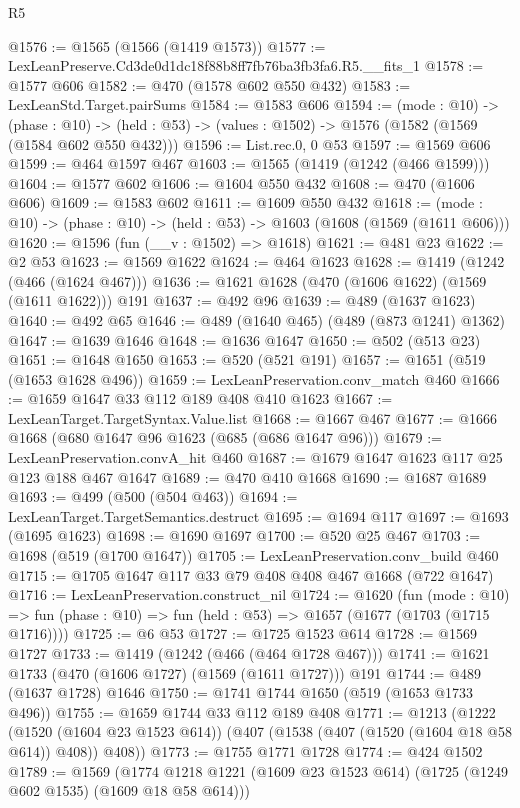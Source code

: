 \begin{lexlean}{R5}
\begin{coremodule}
@1576 := @1565 (@1566 (@1419 @1573))
@1577 := LexLeanPreserve.Cd3de0d1dc18f88b8ff7fb76ba3fb3fa6.R5.__fits_1
@1578 := @1577 @606
@1582 := @470 (@1578 @602 @550 @432)
@1583 := LexLeanStd.Target.pairSums
@1584 := @1583 @606
@1594 := (mode : @10) ->
  (phase : @10) -> (held : @53) -> (values : @1502) -> @1576 (@1582 (@1569 (@1584 @602 @550 @432)))
@1596 := List.rec.{0, 0} @53
@1597 := @1569 @606
@1599 := @464 @1597 @467
@1603 := @1565 (@1419 (@1242 (@466 @1599)))
@1604 := @1577 @602
@1606 := @1604 @550 @432
@1608 := @470 (@1606 @606)
@1609 := @1583 @602
@1611 := @1609 @550 @432
@1618 := (mode : @10) -> (phase : @10) -> (held : @53) -> @1603 (@1608 (@1569 (@1611 @606)))
@1620 := @1596 (fun (__v : @1502) => @1618)
@1621 := @481 @23
@1622 := @2 @53
@1623 := @1569 @1622
@1624 := @464 @1623
@1628 := @1419 (@1242 (@466 (@1624 @467)))
@1636 := @1621 @1628 (@470 (@1606 @1622) (@1569 (@1611 @1622))) @191
@1637 := @492 @96
@1639 := @489 (@1637 @1623)
@1640 := @492 @65
@1646 := @489 (@1640 @465) (@489 (@873 @1241) @1362)
@1647 := @1639 @1646
@1648 := @1636 @1647
@1650 := @502 (@513 @23)
@1651 := @1648 @1650
@1653 := @520 (@521 @191)
@1657 := @1651 (@519 (@1653 @1628 @496))
@1659 := LexLeanPreservation.conv_match @460
@1666 := @1659 @1647 @33 @112 @189 @408 @410 @1623
@1667 := LexLeanTarget.TargetSyntax.Value.list
@1668 := @1667 @467
@1677 := @1666 @1668 (@680 @1647 @96 @1623 (@685 (@686 @1647 @96)))
@1679 := LexLeanPreservation.convA_hit @460
@1687 := @1679 @1647 @1623 @117 @25 @123 @188 @467 @1647
@1689 := @470 @410 @1668
@1690 := @1687 @1689
@1693 := @499 (@500 (@504 @463))
@1694 := LexLeanTarget.TargetSemantics.destruct
@1695 := @1694 @117
@1697 := @1693 (@1695 @1623)
@1698 := @1690 @1697
@1700 := @520 @25 @467
@1703 := @1698 (@519 (@1700 @1647))
@1705 := LexLeanPreservation.conv_build @460
@1715 := @1705 @1647 @117 @33 @79 @408 @408 @467 @1668 (@722 @1647)
@1716 := LexLeanPreservation.construct_nil
@1724 := @1620
    (fun (mode : @10) =>
    fun (phase : @10) => fun (held : @53) => @1657 (@1677 (@1703 (@1715 @1716))))
@1725 := @6 @53
@1727 := @1725 @1523 @614
@1728 := @1569 @1727
@1733 := @1419 (@1242 (@466 (@464 @1728 @467)))
@1741 := @1621 @1733 (@470 (@1606 @1727) (@1569 (@1611 @1727))) @191
@1744 := @489 (@1637 @1728) @1646
@1750 := @1741 @1744 @1650 (@519 (@1653 @1733 @496))
@1755 := @1659 @1744 @33 @112 @189 @408
@1771 := @1213
    (@1222
      (@1520 (@1604 @23 @1523 @614))
      (@407 (@1538 (@407 (@1520 (@1604 @18 @58 @614)) @408)) @408))
@1773 := @1755 @1771 @1728
@1774 := @424 @1502
@1789 := @1569
    (@1774 @1218 @1221 (@1609 @23 @1523 @614) (@1725 (@1249 @602 @1535) (@1609 @18 @58 @614)))

\end{coremodule}
\end{lexlean}
